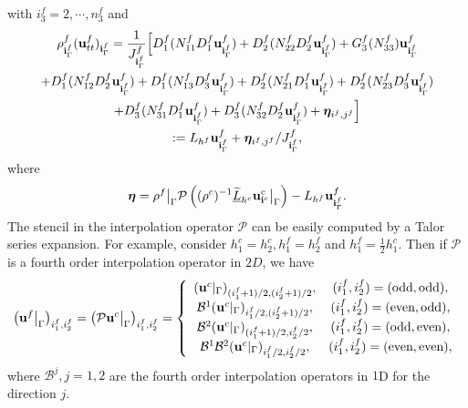 \documentclass[a4paper]{article}
\newcommand{\wt}{\widetilde}
\begin{document}
with $ i_3^f = 2,\cdots,n_3^f$ and
\begin{multline}\label{fine_scheme_1}
\rho_{{\bf i}^f_{\Gamma}}^f ({\bf u}_{tt}^f)_{{\bf i}^f_{\Gamma}} = \frac{1}{J_{{\bf i}^f_{\Gamma}}^f}\Big[D_1^f(N_{11}^fD_1^f{\bf u}_{{\bf i}^f_{\Gamma}}^f)+D_2^f(N_{22}^fD_2^f{\bf u}_{{\bf i}^f_{\Gamma}}^f)
+G_3^f(N_{33}^f){\bf u}_{{\bf i}^f_{\Gamma}}^f\\
+D_1^f(N_{12}^fD_2^f{\bf u}_{{\bf i}^f_{\Gamma}}^f)+D_1^f(N_{13}^fD_3^f{\bf u}_{{\bf i}^f_{\Gamma}}^f)
+D_2^f(N_{21}^fD_1^f{\bf u}_{{\bf i}^f_{\Gamma}}^f)+D_2^f(N_{23}^fD_3^f{\bf u}_{{\bf i}^f_{\Gamma}}^f)\\
+D_3^f(N_{31}^fD_1^f{\bf u}_{{\bf i}^f_{\Gamma}}^f)
+D_3^f(N_{32}^fD_2^f{\bf u}_{{\bf i}^f_{\Gamma}}^f)+{\bm \eta}_{i^f,j^f}\Big]\\
 := L_{h^f}{\bf u}^f_{{\bf i}^f_{\Gamma}}+{\bm \eta}_{i^f,j^f}/J^f_{{\bf i}^f_{\Gamma}},
\end{multline}
where
\begin{equation}\label{eta}
{\bm \eta} = \rho^f\big|_{\Gamma}\mathcal{P}\left((\rho^c)^{-1}\uline{\wt{L}}_{h^c} {\bf{u}}^c_{{\bf i}^c}\big|_{\Gamma}\right) - L_{h^f}{\bf u}^f_{{\bf i}^f_{\Gamma}}.
\end{equation}
The stencil in the interpolation operator $\mathcal{P}$ can be easily computed by a Talor series expansion. For example, consider $h_1^c = h_2^c, h_1^f = h_2^f$ and $h_1^f = \frac{1}{2}h_1^c$. Then if  $\mathcal{P}$ is a fourth order interpolation operator in $2D$, we have
\begin{align}\label{interpolation}
\left({\bf u}^f\big|_{\Gamma}\right)_{i_1^f,i_2^f} = \left(\mathcal{P} {\bf u}^c\big|_{\Gamma}\right)_{i_1^f,i_2^f} = \left\{\begin{array}{cc}
({\bf u}^c|_{\Gamma})_{(i_1^f+1)/2,(i_2^f+1)/2}, &(i_1^f,i_2^f) = (\text{odd},\text{odd}),\\
\mathcal{B}^1 ({\bf u}^c|_{\Gamma})_{i_1^f/2,(i_2^f+1)/2}, &(i_1^f,i_2^f) = (\text{even},\text{odd}),\\
\mathcal{B}^2 ({\bf u}^c|_{\Gamma})_{(i_1^f+1)/2,i_2^f/2},& (i_1^f,i_2^f) = (\text{odd},\text{even}),\\
\mathcal{B}^1\mathcal{B}^2 ({\bf u}^c|_{\Gamma})_{i_1^f/2,i_2^f/2}, & (i_1^f,i_2^f) = (\text{even},\text{even}),
\end{array}\right.
\end{align}
where $\mathcal{B}^j, j = 1,2$ are the fourth order interpolation operators in $1$D for the direction $j$.  
\end{document}
